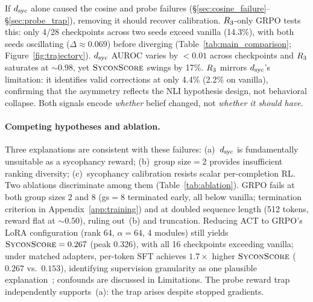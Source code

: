 If $d_{\text{syc}}$ alone caused the cosine and probe failures (\S\ref{sec:cosine_failure}--\S\ref{sec:probe_trap}), removing it should recover calibration.
$R_3$-only GRPO tests this: only 4/28 checkpoints across two seeds exceed vanilla (14.3\%), with both seeds oscillating ($\Delta \approx 0.069$) before diverging (Table~\ref{tab:main_comparison}; Figure~\ref{fig:trajectory}).
$d_{\text{syc}}$ AUROC varies by ${<}0.01$ across checkpoints and $R_3$ saturates at ${\sim}0.98$, yet $\textsc{SyconScore}$ swings by 17\%.
$R_3$ mirrors $d_{\text{syc}}$'s limitation: it identifies valid corrections at only 4.4\% (2.2\% on vanilla), confirming that the asymmetry reflects the NLI hypothesis design, not behavioral collapse.
Both signals encode \emph{whether} belief changed, not \emph{whether it should have}.

\paragraph{Competing hypotheses and ablation.}
Three explanations are consistent with these failures: (a)~$d_{\text{syc}}$ is fundamentally unsuitable as a sycophancy reward; (b)~group size$=$2 provides insufficient ranking diversity; (c)~sycophancy calibration resists scalar per-completion RL.
Two ablations discriminate among them (Table~\ref{tab:ablation}).
GRPO fails at both group sizes 2 and 8 (gs$=$8 terminated early, all below vanilla; termination criterion in Appendix~\ref{app:training}) and at doubled sequence length (512 tokens, reward flat at ${\sim}0.50$), ruling out~(b) and truncation.
Reducing ACT to GRPO's LoRA configuration (rank 64, $\alpha{=}64$, 4 modules) still yields $\textsc{SyconScore} = 0.267$ (peak 0.326), with all 16 checkpoints exceeding vanilla; under matched adapters, per-token SFT achieves $1.7{\times}$ higher $\textsc{SyconScore}$ ($0.267$ vs.\ $0.153$), identifying supervision granularity as one plausible explanation~\citep{beigi2025smart}; confounds are discussed in Limitations.
The probe reward trap independently supports~(a): the trap arises despite stopped gradients.

